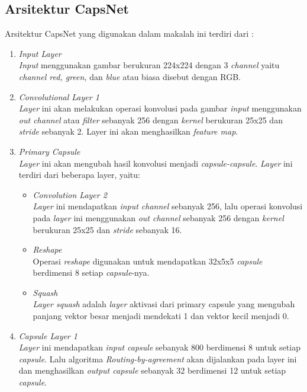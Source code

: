 \documentclass{article}
\begin{document}
	\subsection{Arsitektur CapsNet}
	Arsitektur CapsNet yang digunakan dalam makalah ini terdiri dari :
	\begin{enumerate}
		\item \textit{Input Layer}\\
		\textit{Input} menggunakan gambar berukuran 224x224 dengan 3 \textit{channel} yaitu \textit{channel red, green,} dan \textit{blue} atau biasa disebut dengan RGB.
		
		\item \textit{Convolutional Layer 1}\\
		\textit{Layer} ini akan melakukan operasi konvolusi pada gambar \textit{input} menggunakan \textit{out channel} atau \textit{filter} sebanyak 256 dengan \textit{kernel} berukuran 25x25 dan \textit{stride} sebanyak 2. Layer ini akan menghasilkan \textit{feature map}.
		
		\item \textit{Primary Capsule}\\
		\textit{Layer} ini akan mengubah hasil konvolusi menjadi \textit{capsule-capsule}. \textit{Layer} ini terdiri dari beberapa layer, yaitu:
		\begin{itemize}
			\item \textit{Convolution Layer 2}\\ 
			\textit{Layer} ini mendapatkan \textit{input channel} sebanyak 256, lalu operasi konvolusi pada \textit{layer} ini menggunakan \textit{out channel} sebanyak 256 dengan \textit{kernel} berukuran 25x25  dan \textit{stride} sebanyak 16.
			
			\item \textit{Reshape}\\
			Operasi \textit{reshape} digunakan untuk mendapatkan 32x5x5 \textit{capsule} berdimensi 8 setiap \textit{capsule}-nya.
			
			\item \textit{Squash}\\
			\textit{Layer squash} adalah \textit{layer} aktivasi dari primary capsule yang mengubah panjang vektor besar menjadi mendekati 1 dan vektor kecil menjadi 0.
		\end{itemize}
		
		\item \textit{Capsule Layer 1}\\
		\textit{Layer} ini mendapatkan \textit{input capsule} sebanyak 800 berdimensi 8 untuk setiap \textit{capsule}. Lalu algoritma \textit{Routing-by-agreement} akan dijalankan pada layer ini dan menghasilkan \textit{output capsule} sebanyak 32 berdimensi 12 untuk setiap \textit{capsule}.
		

\end{enumerate}
\end{document}
